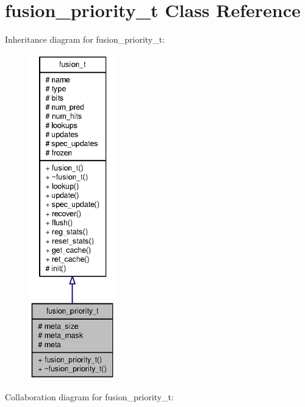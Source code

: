 \section{fusion\_\-priority\_\-t Class Reference}
\label{classfusion__priority__t}
Inheritance diagram for fusion\_\-priority\_\-t:\nopagebreak
\begin{figure}[H]
\begin{center}
\leavevmode
\includegraphics[height=400pt]{classfusion__priority__t__inherit__graph}
\end{center}
\end{figure}
Collaboration diagram for fusion\_\-priority\_\-t:\nopagebreak
